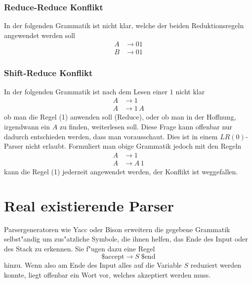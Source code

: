 \subsubsection{Reduce-Reduce Konflikt}
In der folgenden Grammatik ist nicht klar, welche der beiden Reduktionsregeln
angewendet werden soll
\begin{align*}
A&\rightarrow 01\\
B&\rightarrow 01
\end{align*}

\subsubsection{Shift-Reduce Konflikt}
In der folgenden Grammatik ist nach dem Lesen einer $1$ nicht klar
\begin{align*}
A&\rightarrow 1\tag{1}\\
A&\rightarrow 1\,A\tag{2}
\end{align*}
ob man die Regel (1) anwenden soll (Reduce), oder ob man
in der Hoffnung, irgendwann ein $A$ zu finden, weiterlesen
soll. Diese Frage kann offenbar nur dadurch entschieden werden, dass
man vorausschaut. Dies ist in einem $LR(0)$-Parser nicht erlaubt.
Formuliert man obige Grammatik jedoch mit den Regeln
\begin{align*}
A&\rightarrow 1\tag{1}\\
A&\rightarrow A\,1\tag{2}
\end{align*}
kann die Regel (1) jederzeit angewendet werden, der Konflikt ist
weggefallen. 

\section{Real existierende Parser}
Parsergeneratoren wie Yacc oder Bison erweitern die gegebene Grammatik
selb\-st"andig um zus"atzliche Symbole, die ihnen helfen, das Ende
des Input oder des Stack zu erkennen. Sie f"ugen dazu eine
Regel
\[
\text{\$accept}\rightarrow S\; \text{\$end}
\]
hinzu. Wenn also am Ende des Input alles auf die Variable $S$ reduziert
werden konnte, liegt offenbar ein Wort vor, welches akzeptiert werden
muss.


